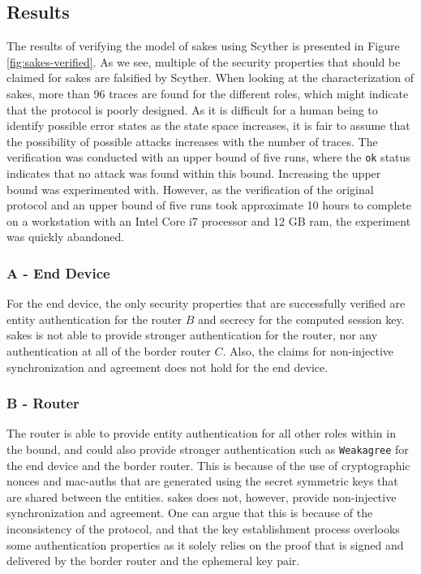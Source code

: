 \subsection{Results}

The results of verifying the model of \gls{sakes} using Scyther is presented in Figure \ref{fig:sakes-verified}. As we see, multiple of the security properties that should be claimed for \gls{sakes} are falsified by Scyther. When looking at the characterization of \gls{sakes}, more than 96 traces are found for the different roles, which might indicate that the protocol is poorly designed. As it is difficult for a human being to identify possible error states as the state space increases, it is fair to assume that the possibility of possible attacks increases with the number of traces. The verification was conducted with an upper bound of five runs, where the \texttt{ok} status indicates that no attack was found within this bound. Increasing the upper bound was experimented with. However, as the verification of the original protocol and an upper bound of five runs took approximate 10 hours to complete on a workstation with an Intel Core i7 processor and 12 GB \gls{ram}, the experiment was quickly abandoned.

\subsubsection{A - End Device}

For the end device, the only security properties that are successfully verified are entity authentication for the router $B$ and secrecy for the computed session key. \gls{sakes} is not able to provide stronger authentication for the router, nor any authentication at all of the border router $C$. Also, the claims for non-injective synchronization and agreement does not hold for the end device.

\subsubsection{B - Router}

The router is able to provide entity authentication for all other roles within in the bound, and could also provide stronger authentication such as \texttt{Weakagree} for the end device and the border router. This is because of the use of cryptographic nonces and \gls{mac-auth}s that are generated using the secret symmetric keys that are shared between the entities. \gls{sakes} does not, however, provide non-injective synchronization and agreement. One can argue that this is because of the inconsistency of the protocol, and that the key establishment process overlooks some authentication properties as it solely relies on the proof that is signed and delivered by the border router and the ephemeral key pair. 

